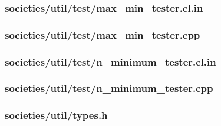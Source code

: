 \documentclass{article}
\begin{document}
\subsubsection*{societies/util/test/max\_min\_tester.cl.in}


\subsubsection*{societies/util/test/max\_min\_tester.cpp}


\subsubsection*{societies/util/test/n\_minimum\_tester.cl.in}


\subsubsection*{societies/util/test/n\_minimum\_tester.cpp}


\subsubsection*{societies/util/types.h}

\end{document}
